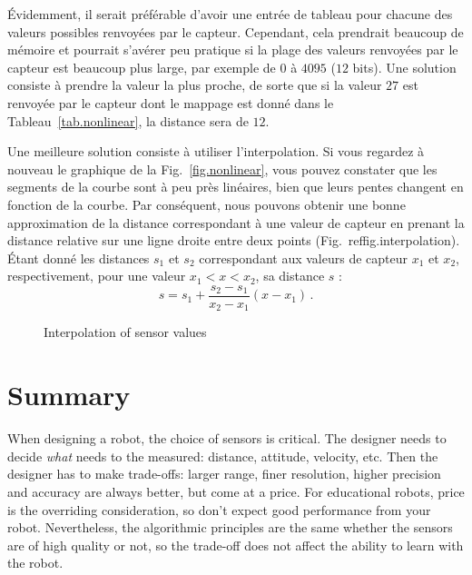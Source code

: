 {Évidemment, il serait préférable d'avoir une entrée de tableau pour chacune des valeurs possibles renvoyées par le capteur. Cependant, cela prendrait beaucoup de mémoire et pourrait s'avérer peu pratique si la plage des valeurs renvoyées par le capteur est beaucoup plus large, par exemple de $0$ à $4095$ ($12$ bits). Une solution consiste à prendre la valeur la plus proche, de sorte que si la valeur $27$ est renvoyée par le capteur dont le mappage est donné dans le Tableau~\ref{tab.nonlinear}, la distance sera de $12$.

Une meilleure solution consiste à utiliser l'interpolation. Si vous regardez à nouveau le graphique de la Fig.~\ref{fig.nonlinear}, vous pouvez constater que les segments de la courbe sont à peu près linéaires, bien que leurs pentes changent en fonction de la courbe. Par conséquent, nous pouvons obtenir une bonne approximation de la distance correspondant à une valeur de capteur en prenant la distance relative sur une ligne droite entre deux points (Fig.~ref{fig.interpolation}). Étant donné les distances $s_1$ et $s_2$ correspondant aux valeurs de capteur $x_1$ et $x_2$, respectivement, pour une valeur $x_1<x<x_2$, sa distance $s$ :
\[
s = s_1 + \frac{s_2-s_1}{x_2-x_1}(x-x_1)\,.
\]

\begin{figure}
\begin{center}
\caption{Interpolation of sensor values}\label{fig.interpolation}
\end{center}
\end{figure}

\section{Summary}

When designing a robot, the choice of sensors is critical. The designer needs to decide \emph{what} needs to the measured: distance, attitude, velocity, etc. Then the designer has to make trade-offs: larger range, finer resolution, higher precision and accuracy are always better, but come at a price. For educational robots, price is the overriding consideration, so don't expect good performance from your robot. Nevertheless, the algorithmic principles are the same whether the sensors are of high quality or not, so the trade-off does not affect the ability to learn with the robot.

}
